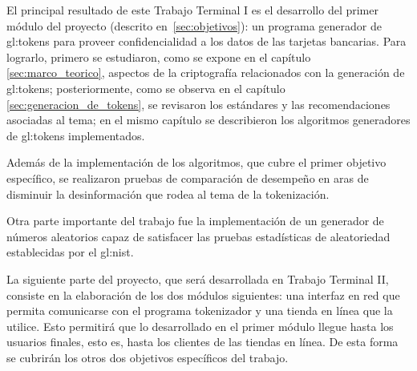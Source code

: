 %
%

%
%
El principal resultado de este Trabajo Terminal I es el desarrollo del primer
módulo del proyecto (descrito en~\ref{sec:objetivos}): un programa generador de
\glspl{gl:token} para proveer confidencialidad a los datos de las tarjetas
bancarias. Para lograrlo, primero se estudiaron, como se expone en el capítulo
\ref{sec:marco_teorico}, aspectos de la criptografía relacionados con la
generación de \glspl{gl:token}; posteriormente, como se observa en el capítulo
\ref{sec:generacion_de_tokens}, se revisaron los estándares y las
recomendaciones asociadas al tema; en el mismo capítulo se describieron los
algoritmos generadores de \glspl{gl:token} implementados.

Además de la implementación de los algoritmos, que cubre el primer objetivo
específico, se realizaron pruebas de comparación de desempeño en aras de
disminuir la desinformación que rodea al tema de la tokenización.

Otra parte importante del trabajo fue la implementación de un generador de
números aleatorios capaz de satisfacer las pruebas estadísticas de aleatoriedad
establecidas por el \gls{gl:nist}\footnotemark.


La siguiente parte del proyecto, que será desarrollada en Trabajo Terminal II,
consiste en la elaboración de los dos módulos siguientes: una interfaz en red
que permita comunicarse con el programa tokenizador y una tienda en línea que la
utilice. Esto permitirá que lo desarrollado en el primer módulo llegue hasta los
usuarios finales, esto es, hasta los clientes de las tiendas en línea.
De esta forma se cubrirán los otros dos objetivos específicos del trabajo.
